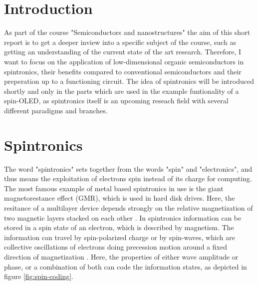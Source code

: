 


\section{Introduction}
\label{sec:Introduction}
As part of the course "Semiconductors and nanostructures" the aim of this short report is to get a deeper inview into a specific subject of the course, such as getting an understanding of the current state of the art research.
Therefore, I want to focus on the application of low-dimensional organic semiconductors in spintronics, their benefits compared to conventional semiconductors and their preperation up to a functioning circuit.
The idea of spintronics will be introduced shortly and only in the parts which are used in the example funtionality of a spin-OLED, as spintronics itself is an upcoming reseach field with several different paradigms and branches.

\section{Spintronics}
\label{sec:spintronics}

The word "spintronics" sets together from the words "spin" and "electronics", and thus means the exploitation of electrons spin instead of its charge for computing.
The most famous example of metal based spintronics in use is the giant magnetorestance effect (GMR), which is used in hard disk drives.
Here, the resitance of a multilayer device depends strongly on the relative magnetization of two magnetic layers stacked on each other \cite{perovskite}.
In spintronics information can be stored in a spin state of an electron, which is described by magnetism.
The information can travel by spin-polarized charge or by spin-waves, which are collective oscillations of electrons doing precession motion around a fixed direction of magnetization \cite{clocks}.
Here, the properties of either wave amplitude or phase, or a combination of both can code the information states, as depicted in figure \ref{fig:spin-coding}.

